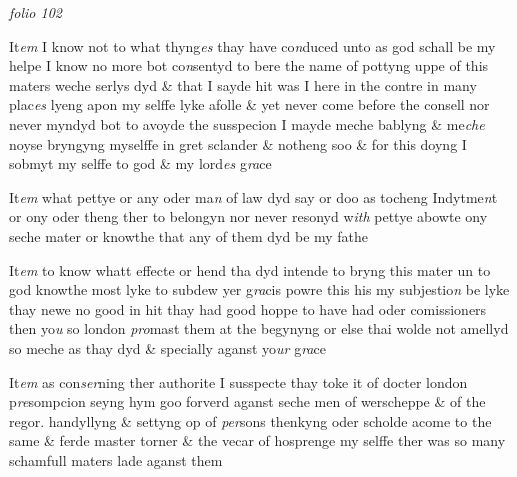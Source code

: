 \documentclass[12pt, a4paper]{book}
\begin{document}
\dotfill
						\newpage
{}

\textit{folio 102}


 	
				\marginpar[\vspace{0.5cm}{\textcolor{Gray}{9.}}]{}
			
		\ifthenelse{\isodd{\thepage}}
		{\reversemarginpar}
		{\normalmarginpar}
		 It\textit{em} I know not to what thyng\textit{es} thay have co\textit{n}duced unto
 as god schall be my helpe I know no more bot co\textit{n}sentyd
 to bere the name of pottyng uppe of this maters weche
 serlys dyd \& that I sayde hit was I here in the contre
 in many plac\textit{es} lyeng apon my selffe lyke afolle \& yet
 never come before the consell nor never myndyd bot to
 avoyde the susspecion I mayde meche bablyng \& me\textit{che} noyse
 bryngyng myselffe in gret sclander \& notheng soo \& for
 this doyng I sobmyt my selffe to god \& my lord\textit{es} g\textit{ra}ce
 	
				\marginpar[\vspace{0.5cm}{\textcolor{Gray}{10.}}]{}
			
		\ifthenelse{\isodd{\thepage}}
		{\reversemarginpar}
		{\normalmarginpar}
		 It\textit{em} what pettye or any oder ma\textit{n} of law dyd say or doo
 as tocheng Indytme\textit{n}t or ony oder theng ther to belongyn
 nor never resonyd w\textit{ith} pettye abowte ony seche mater
 or knowthe that any of them dyd be my fathe
 	
				\marginpar[\vspace{0.5cm}{\textcolor{Gray}{11.}}]{}
			
		\ifthenelse{\isodd{\thepage}}
		{\reversemarginpar}
		{\normalmarginpar}
		 It\textit{em} to know whatt effecte or hend tha dyd intende to bryng
 		this mater un to god knowthe most lyke to subdew yer
 g\textit{ra}cis powre this his my subjestio\textit{n} be lyke thay newe
 no good in hit thay had good hoppe to have had
 oder comissioners then yo\textit{u} so london \textit{pro}mast them
 at the begynyng or else thai wolde not amellyd so
 meche as thay dyd \& specially aganst yo\textit{ur} g\textit{ra}ce
 	
				\marginpar[\vspace{0.5cm}{\textcolor{Gray}{12.}}]{}
			
		\ifthenelse{\isodd{\thepage}}
		{\reversemarginpar}
		{\normalmarginpar}
		 It\textit{em} as con\textit{ser}ning ther authorite I susspecte thay toke
 		it of docter london p\textit{re}sompcion seyng hym goo forverd
 aganst seche men of werscheppe \& of the regor.
 handyllyng \& settyng op of \textit{per}sons thenkyng oder
 		scholde acome to the same \& ferde master torner \&
 the vecar of hosprenge my selffe ther was so many
 schamfull maters lade aganst them
 
\end{document}
